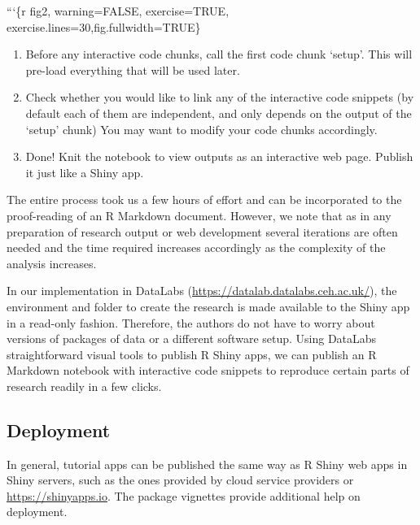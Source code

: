 \begin{example}
```\{r fig2, warning=FALSE, exercise=TRUE, exercise.lines=30,fig.fullwidth=TRUE\}
\end{example}

\begin{enumerate}
\def\labelenumi{\arabic{enumi}.}
\setcounter{enumi}{3}
\tightlist
\item
  Before any interactive code chunks, call the first code chunk `setup'.
  This will pre-load everything that will be used later.
\item
  Check whether you would like to link any of the interactive code
  snippets (by default each of them are independent, and only depends on
  the output of the `setup' chunk) You may want to modify your code
  chunks accordingly.
\item
  Done! Knit the notebook to view outputs as an interactive web page.
  Publish it just like a Shiny app.
\end{enumerate}

The entire process took us a few hours of effort and can be incorporated
to the proof-reading of an R Markdown document. However, we note that as
in any preparation of research output or web development several
iterations are often needed and the time required increases accordingly
as the complexity of the analysis increases.

In our implementation in DataLabs
(\url{https://datalab.datalabs.ceh.ac.uk/}), the environment and folder
to create the research is made available to the Shiny app in a read-only
fashion. Therefore, the authors do not have to worry about versions of
packages of data or a different software setup. Using DataLabs
straightforward visual tools to publish R Shiny apps, we can publish an
R Markdown notebook with interactive code snippets to reproduce certain
parts of research readily in a few clicks.

\hypertarget{deployment}{%
\subsection{Deployment}\label{deployment}}

In general,  tutorial apps can be published the same way
as R Shiny web apps in Shiny servers, such as the ones provided by cloud
service providers or \url{https://shinyapps.io}. The 
package vignettes provide additional help on deployment.

